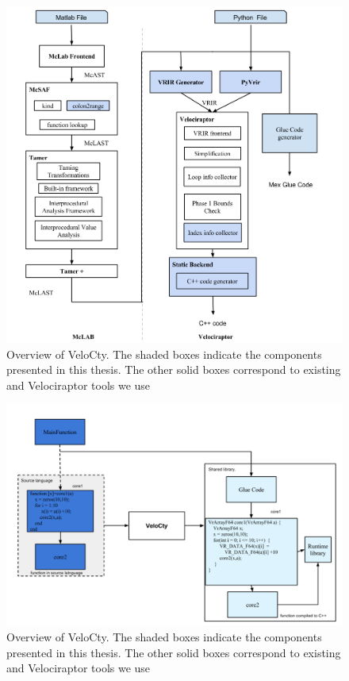 \begin{figure}[htbp]
\begin{center}
\includegraphics[scale=0.5]{Figures/Overview_thesis.png}
\caption[Overview of the VeloCty]{Overview
of VeloCty. The shaded boxes indicate the components
presented in this thesis. The other solid boxes correspond to
existing \mclab and Velociraptor tools we use}\label{Fig:Overview}
\end{center}
\end{figure}
\begin{figure}[htbp]
\begin{center}
\includegraphics[scale=0.5]{Figures/WorkingDetails.png}
\caption[Overview of the VeloCty]{Overview
of VeloCty. The shaded boxes indicate the components
presented in this thesis. The other solid boxes correspond to
existing \mclab and Velociraptor tools we use}\label{Fig:working}
\end{center}
\end{figure}
